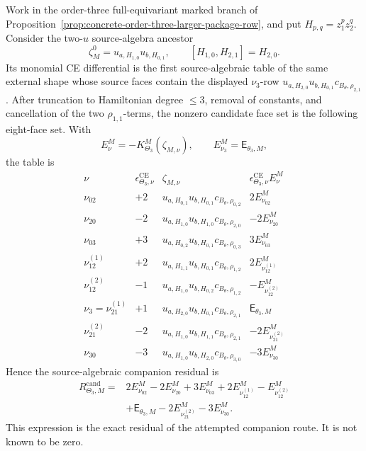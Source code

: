 \begin{thm}\label{thm:theta-three-companion-face-obstruction}
  Work in the order-three full-equivariant marked branch of
  Proposition~\ref{prop:concrete-order-three-larger-package-row}, and put
  \(H_{p,q}=z_1^pz_2^q\).  Consider the two-\(u\) source-algebra ancestor
  \[
    \zeta^0_M=u_{a,H_{1,0}}u_{b,H_{0,1}},
    \qquad
    [H_{1,0},H_{2,1}]=H_{2,0}.
  \]
  Its monomial CE differential is the first source-algebraic table of the
  same external shape whose source faces contain the displayed
  \(\nu_3\)-row
  \(u_{a,H_{2,0}}u_{b,H_{0,1}}c_{B_\theta,\rho_{2,1}}\).  After truncation
  to Hamiltonian degree \(\leq3\), removal of constants, and cancellation of
  the two \(\rho_{1,1}\)-terms, the nonzero candidate face set is the
  following eight-face set.  With
  \[
    E^M_\nu=-K^M_{\Theta_3}(\zeta_{M,\nu}),
    \qquad
    E^M_{\nu_3}=\mathsf E_{\theta_3,M},
  \]
  the table is
  \[
  \begin{array}{c|c|l|l}
    \nu & \epsilon^{\mathrm{CE}}_{\Theta_3,\nu}
      & \zeta_{M,\nu} & \epsilon^{\mathrm{CE}}_{\Theta_3,\nu}E^M_\nu \\
    \hline
    \nu_{02} & +2
      & u_{a,H_{0,1}}u_{b,H_{0,1}}c_{B_\theta,\rho_{0,2}}
      & 2E^M_{\nu_{02}} \\
    \nu_{20} & -2
      & u_{a,H_{1,0}}u_{b,H_{1,0}}c_{B_\theta,\rho_{2,0}}
      & -2E^M_{\nu_{20}} \\
    \nu_{03} & +3
      & u_{a,H_{0,2}}u_{b,H_{0,1}}c_{B_\theta,\rho_{0,3}}
      & 3E^M_{\nu_{03}} \\
    \nu_{12}^{(1)} & +2
      & u_{a,H_{1,1}}u_{b,H_{0,1}}c_{B_\theta,\rho_{1,2}}
      & 2E^M_{\nu_{12}^{(1)}} \\
    \nu_{12}^{(2)} & -1
      & u_{a,H_{1,0}}u_{b,H_{0,2}}c_{B_\theta,\rho_{1,2}}
      & -E^M_{\nu_{12}^{(2)}} \\
    \nu_3=\nu_{21}^{(1)} & +1
      & u_{a,H_{2,0}}u_{b,H_{0,1}}c_{B_\theta,\rho_{2,1}}
      & \mathsf E_{\theta_3,M} \\
    \nu_{21}^{(2)} & -2
      & u_{a,H_{1,0}}u_{b,H_{1,1}}c_{B_\theta,\rho_{2,1}}
      & -2E^M_{\nu_{21}^{(2)}} \\
    \nu_{30} & -3
      & u_{a,H_{1,0}}u_{b,H_{2,0}}c_{B_\theta,\rho_{3,0}}
      & -3E^M_{\nu_{30}}
  \end{array}
  \]
  Hence the source-algebraic companion residual is
  \[
  \begin{aligned}
    R^{\mathrm{cand}}_{\Theta_3,M}
      ={}&2E^M_{\nu_{02}}-2E^M_{\nu_{20}}
          +3E^M_{\nu_{03}}+2E^M_{\nu_{12}^{(1)}}
          -E^M_{\nu_{12}^{(2)}}\\
       &+\mathsf E_{\theta_3,M}
          -2E^M_{\nu_{21}^{(2)}}-3E^M_{\nu_{30}} .
  \end{aligned}
  \]
  This expression is the exact residual of the attempted companion route.
  It is not known to be zero.


\end{thm}
